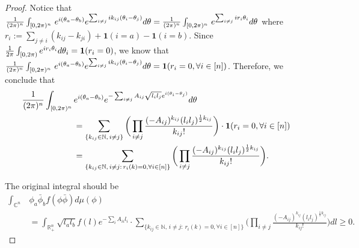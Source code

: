 \documentclass[10pt,a4paper]{amsart}
\newcommand{\compi}{\textnormal{i}}
\newcommand{\ind}{\mathbf{1}}
\begin{document}
\begin{proof}
Notice that $\frac{1}{(2\pi)^n}\int_{[0,2\pi)^n}\, e^{\compi(\theta_a-\theta_b)}e^{\sum_{i\neq j}\compi k_{ij}(\theta_i-\theta_j)} d\theta=\frac{1}{(2\pi)^n}\int_{[0,2\pi)^n}\, e^{\sum_{i\neq j}\compi r_i\theta_i} d\theta$ where $r_i:=\sum_{j\neq i} (k_{ij}- k_{ji})+\ind(i=a)-\ind(i=b)$. Since $\frac{1}{2\pi}\int_{[0,2\pi)}e^{\compi r_i\theta_i}d\theta_i=\ind(r_i=0)$, we know that $\frac{1}{(2\pi)^n}\int_{[0,2\pi)^n}\, e^{\compi(\theta_a-\theta_b)}e^{\sum_{i\neq j}\compi k_{ij}(\theta_i-\theta_j)} d\theta=\ind(r_i=0,\forall i\in[n])$. Therefore, we conclude that
    \begin{align*}
    \frac{1}{(2\pi)^n}\int_{[0,2\pi)^n}\, & e^{\compi(\theta_a-\theta_b)}   e^{-\sum_{i\neq j} A_{ij}\sqrt{l_i l_j}e^{\compi(\theta_i-\theta_j)}} d\theta \\
    &= \sum_{\{k_{ij}\in\mathbb{N}, \,i\neq j\}}\bigg(\prod_{i\neq j} \frac{(- A_{ij})^{k_{ij}}(l_i l_j)^{\frac{1}{2}k_{ij}}}{k_{ij}!}\bigg)\cdot \ind(r_i=0,\forall i\in[n])\\
    &= \sum_{\{k_{ij}\in\mathbb{N},\,i\neq j:\, r_i(k)=0,\forall i\in[n]\}}\bigg(\prod_{i\neq j} \frac{(- A_{ij})^{k_{ij}}(l_i l_j)^{\frac{1}{2}k_{ij}}}{k_{ij}!}\bigg).
    \end{align*}

The original integral should be
    \begin{align*}
    \int_{\mathbb{C}^n}\, & \phi_a\bar{\phi}_b f(\phi\bar{\phi}) d\mu(\phi) \\
    & = \int_{\mathbb{R}_+^n}\sqrt{l_a l_b} f(l) e^{-\sum_{i} A_{ii}l_i} \cdot \sum_{\{k_{ij}\in\mathbb{N},\,i\neq j:\, r_i(k)=0,\forall i\in[n]\}}\bigg(\prod_{i\neq j} \frac{(- A_{ij})^{k_{ij}}(l_i l_j)^{\frac{1}{2}k_{ij}}}{k_{ij}!}\bigg) dl\geq 0.
    \end{align*}


\end{proof}
\end{document}
